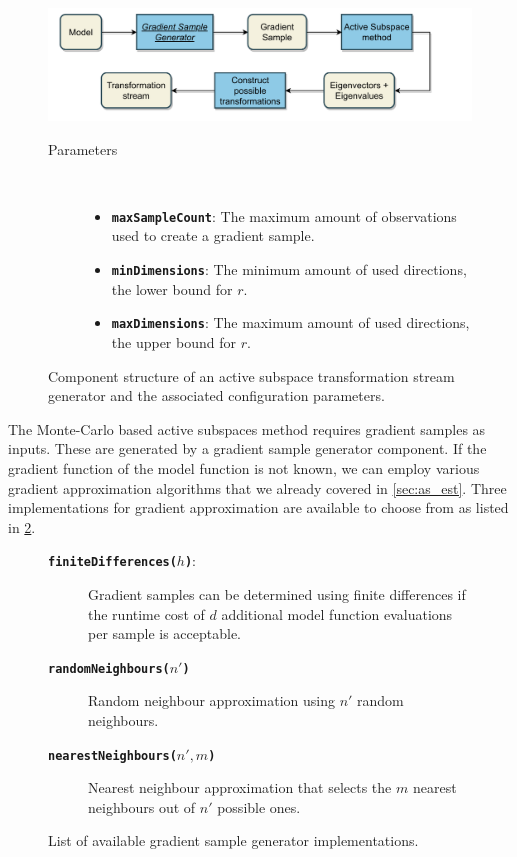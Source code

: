 \documentclass[
  a4paper,  %
  twoside,  %
  bibliography=totoc,
  headsepline,
  cleardoublepage=empty,
  parskip=half,
  draft=false
]{scrbook}
\begin{document}
\begin{mdframed}[style=style,frametitle={Transformation stream generator (active subspaces)}]
\begin{figure}[H]
\includegraphics[width=\textwidth]{graphics/TransformationStreamGen_AS.pdf}

\delimit

\begin{description}
\item[Parameters] {~ \begin{itemize}[\indent{}]
\item \texttt{\textbf{maxSampleCount}}: The maximum amount of observations used to create a gradient sample.
\item \texttt{\textbf{minDimensions}}: The minimum amount of used directions, \ie the lower bound for $r$.
\item \texttt{\textbf{maxDimensions}}: The maximum amount of used directions, \ie the upper bound for $r$.
\end{itemize}}
\end{description}
\delimit
\caption{Component structure of an active subspace transformation stream generator and the associated configuration parameters.}
\label{fig:astsg}
\end{figure}
\end{mdframed}
%
The Monte-Carlo based active subspaces method requires gradient samples as inputs.
These are generated by a gradient sample generator component.
If the gradient function of the model function is not known, we can employ various gradient approximation algorithms that we already covered in \cref{sec:as_est}.
Three implementations for gradient approximation are available to choose from as listed in \cref{fig:gg}.

\begin{mdframed}[style=style,frametitle={Gradient sample generators}]
\begin{figure}[H]
\begin{description}
\item[\texttt{\textbf{finiteDifferences($h$)}}:] Gradient samples can be determined using finite differences if the runtime cost of $d$ additional model function evaluations per sample is acceptable.
\item[\texttt{\textbf{randomNeighbours($n'$)}}] Random neighbour approximation using $n'$ random neighbours.
\item[\texttt{\textbf{nearestNeighbours($n', m$)}}] Nearest neighbour approximation that selects the $m$ nearest neighbours out of $n'$ possible ones.
\end{description}
\delimit
\caption{List of available gradient sample generator implementations.}
\label{fig:gg}
\end{figure}
\end{mdframed}
\end{document}
